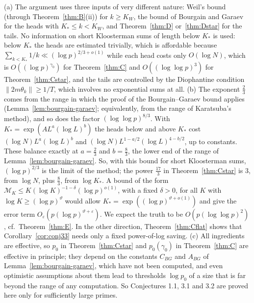 \begin{remark}\label{rem:thmC}
(a) The argument uses three inputs of very different nature: Weil's bound (through Theorem~\ref{thm:B}(ii)) for $k\ge K_W$, the
bound of Bourgain and Garaev for the heads with $K_*\le k<K_W$, and Theorem~\ref{thm:D} or~\ref{thm:Dstar} for the tails. No information on short
Kloosterman sums of length below $K_*$ is used: below $K_*$ the heads are estimated trivially, which is affordable
because $\sum_{k<K_*}1/k\ll(\log p)^{2/3+o(1)}$ while each head costs only $O(\log N)$, which is $O((\log p)^{\gamma_0})$ for Theorem~\ref{thm:C} and $O((\log\log p)^3)$ for Theorem~\ref{thm:Cstar}, and the
tails are controlled by the Diophantine condition $\|2m\theta_k\|\ge1/T$, which involves no exponential sums at all.
(b) The exponent $\frac23$ comes from the range in which the proof of the Bourgain--Garaev bound applies
(Lemma~\ref{lem:bourgain-garaev}; equivalently, from the range of Karatsuba's method), and so does the factor
$(\log\log p)^{8/3}$. With $K_*=\exp(AL^a(\log L)^b)$ the heads below and above $K_*$ cost
$(\log N)L^a(\log L)^b$ and $(\log N)L^{1-a/2}(\log L)^{4-b/2}$, up to constants. These balance exactly at $a=\frac23$ and
$b=\frac83$, the lower end of the range of Lemma~\ref{lem:bourgain-garaev}. So, with this bound for short Kloosterman sums,
$(\log p)^{2/3}$ is the limit of the method; the power $\frac{17}3$ in Theorem~\ref{thm:Cstar} is $3$, from $\log N$,
plus $\frac83$, from $\log K_*$. A
bound of the form $\mathcal{M}_K\le K(\log K)^{-1-\delta}(\log p)^{o(1)}$, with a fixed $\delta>0$, for all $K$ with
$\log K\ge(\log p)^\vartheta$ would allow $K_*=\exp((\log p)^{\vartheta+o(1)})$ and give the error term
$O_\varepsilon(p(\log p)^{\vartheta+\varepsilon})$. We expect the truth to be $O(p(\log\log p)^2)$, cf.\ Theorem~\ref{thm:E}. In the other direction, Theorem~\ref{thm:Cflat} shows that Corollary~\ref{cor:conj33} needs only a fixed power-of-log saving.
(c) All ingredients are effective, so $p_0$ in Theorem~\ref{thm:Cstar} and $p_0(\gamma_0)$ in Theorem~\ref{thm:C} are effective in principle; they depend on the constants $C_{BG}$
and $A_{BG}$ of Lemma~\ref{lem:bourgain-garaev}, which have not been computed, and even optimistic assumptions about
them lead to thresholds $\log p_0$ of a size
that is far beyond the range of any computation. So Conjectures 1.1, 3.1 and 3.2 are proved here only for
sufficiently large primes.
\end{remark}
